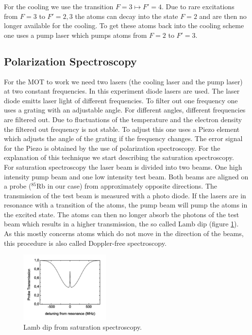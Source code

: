 For the cooling we use the transition $F=3 \mapsto F'=4$. Due to rare excitations from $F=3$ to $F'=2,3$ the atoms can decay into the state $F=2$ and are then no longer available for the cooling. To get these atoms back into the cooling scheme one uses a pump laser which pumps atoms from $F=2$ to $F'=3$. 

\subsection{Polarization Spectroscopy}
For the MOT to work we need two lasers (the cooling laser and the pump laser) at two constant frequencies. In this experiment diode lasers are used. The laser diode emitts laser light of different frequencies. To filter out one frequency one uses a grating with an adjustable angle. For different angles, different frequencies are filtered out. Due to fluctuations of the temperature and the electron density the filtered out frequency is not stable. To adjust this one uses a Piezo element which adjusts the angle of the grating if the frequency changes. The error signal for the Piezo is obtained by the use of polarization spectroscopy. For the explanation of this technique we start describing the saturation spectroscopy.\\

For saturation spectroscopy the laser beam is divided into two beams. One high intensity pump beam and one low intensity test beam. Both beams are aligned on a probe ($^{85}$Rb in our case) from approximately opposite directions. The transmission of the test beam is measured with a photo diode. If the lasers are in resonance with a transition of the atoms, the pump beam will pump the atoms in the excited state. The atoms can then no longer absorb the photons of the test beam which results in a higher transmission, the so called Lamb dip (figure \ref{fig:lamb_dip}). As this mostly concerns atoms which do not move in the direction of the beams, this procedure is also called Doppler-free spectroscopy.
\begin{figure}[h]
  \centering
  \includegraphics[width=0.4\textwidth]{figures/lamb_dip.png}
  \caption{Lamb dip from saturation spectroscopy.}
  \label{fig:lamb_dip}
\end{figure}

